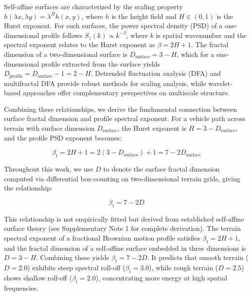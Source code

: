 \documentclass[11pt]{article}
\begin{document}
Self-affine surfaces are characterized by the scaling property $h(\lambda x, \lambda y) = \lambda^H h(x,y)$, where $h$ is the height field and $H \in (0,1)$ is the Hurst exponent\cite{MandelbrotVanNess1968}. For such surfaces, the power spectral density (PSD) of a one-dimensional profile follows $S_z(k) \propto k^{-\beta}$, where $k$ is spatial wavenumber and the spectral exponent relates to the Hurst exponent as $\beta = 2H + 1$\cite{MandelbrotVanNess1968}. The fractal dimension of a two-dimensional surface is $D_{\text{surface}} = 3 - H$\cite{Mandelbrot1982,Turcotte1997}, which for a one-dimensional profile extracted from the surface yields $D_{\text{profile}} = D_{\text{surface}} - 1 = 2 - H$. Detrended fluctuation analysis (DFA)\cite{Peng1994} and multifractal DFA\cite{Kantelhardt2002} provide robust methods for scaling analysis, while wavelet-based approaches\cite{Muzy1993,Mallat2009} offer complementary perspectives on multiscale structure.

Combining these relationships, we derive the fundamental connection between surface fractal dimension and profile spectral exponent. For a vehicle path across terrain with surface dimension $D_{\text{surface}}$, the Hurst exponent is $H = 3 - D_{\text{surface}}$, and the profile PSD exponent becomes:

\begin{equation}
\beta_t = 2H + 1 = 2(3 - D_{\text{surface}}) + 1 = 7 - 2D_{\text{surface}}
\end{equation}

Throughout this work, we use $D$ to denote the surface fractal dimension computed via differential box-counting on two-dimensional terrain grids, giving the relationship:

\begin{equation}
\beta_t = 7 - 2D
\end{equation}

This relationship is not empirically fitted but derived from established self-affine surface theory (see Supplementary Note 1 for complete derivation). The terrain spectral exponent of a fractional Brownian motion profile satisfies $\beta_t = 2H + 1$\cite{MandelbrotVanNess1968}, and the fractal dimension of a self-affine surface embedded in three dimensions is $D = 3 - H$\cite{Mandelbrot1982,Turcotte1997}. Combining these yields $\beta_t = 7 - 2D$. It predicts that smooth terrain ($D = 2.0$) exhibits steep spectral roll-off ($\beta_t = 3.0$), while rough terrain ($D = 2.5$) shows shallow roll-off ($\beta_t = 2.0$), concentrating more energy at high spatial frequencies.
\end{document}
